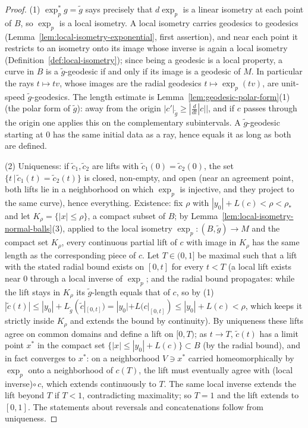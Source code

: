 \begin{proof}
(1) $\exp_p^*g=\tilde g$ says precisely that $d\exp_p$ is a
linear isometry at each point of $B$, so $\exp_p$ is a local
isometry. A local isometry carries geodesics to geodesics
(Lemma~\ref{lem:local-isometry-exponential}, first assertion),
and near each point it restricts to an isometry onto its image
whose inverse is again a local isometry
(Definition~\ref{def:local-isometry}); since being a geodesic is a
local property, a curve in $B$ is a $\tilde g$-geodesic if and
only if its image is a geodesic of $M$. In particular the rays
$t\mapsto tv$, whose images are the radial geodesics
$t\mapsto\exp_p(tv)$, are unit-speed $\tilde g$-geodesics. The
length estimate is
Lemma~\ref{lem:geodesic-polar-form}(1) (the polar form of $\tilde
g$): away from the origin $|c'|_{\tilde g}\ge|\frac{d}{dt}|c||$,
and if $c$ passes through the origin one applies this on the
complementary subintervals. A $\tilde g$-geodesic starting at $0$
has the same initial data as a ray, hence equals it as long as both
are defined.

(2) Uniqueness: if $\tilde c_1,\tilde c_2$ are lifts with $\tilde
c_1(0)=\tilde c_2(0)$, the set $\{t\,|\,\tilde c_1(t)=\tilde
c_2(t)\}$ is closed, non-empty, and open (near an agreement point,
both lifts lie in a neighborhood on which $\exp_p$ is
injective, and they project to the same curve), hence everything.
Existence: fix $\rho$ with $|y_0|+L(c)<\rho<\rho_*$ and let
$K_\rho=\{|x|\le\rho\}$, a compact subset of $B$; by
Lemma~\ref{lem:local-isometry-normal-balls}(3), applied to the
local isometry $\exp_p\colon(B,\tilde g)\to M$ and the compact
set $K_\rho$, every continuous partial lift of $c$ with image in
$K_\rho$ has the same length as the corresponding piece of $c$.
Let $T\in(0,1]$ be maximal such that a lift with the
stated radial bound exists on $[0,t]$ for every $t<T$ (a local lift
exists near $0$ through a local inverse of $\exp_p$; and the
radial bound propagates: while the lift stays in $K_\rho$ its
$\tilde g$-length equals that of $c$, so by (1)
$|\tilde c(t)|\le
|y_0|+L_{\tilde g}(\tilde c|_{[0,t]})=|y_0|+L(c|_{[0,t]})
\le|y_0|+L(c)<\rho$, which keeps it strictly inside $K_\rho$ and
extends the bound by continuity). By uniqueness these lifts agree
on common domains and
define a lift on $[0,T)$; as $t\to T$, $\tilde c(t)$ has a limit
point $x^*$ in the compact set $\{|x|\le|y_0|+L(c)\}\subset B$
(by the radial bound), and in fact converges to $x^*$: on a
neighborhood $V\ni x^*$ carried homeomorphically by $\exp_p$
onto a neighborhood of $c(T)$, the lift must eventually agree with
(local inverse)$\circ\,c$, which extends continuously to $T$. The
same local inverse extends the lift beyond $T$ if $T<1$,
contradicting maximality; so $T=1$ and the lift extends to $[0,1]$.
The statements about reversals and concatenations follow from
uniqueness.


\end{proof}
